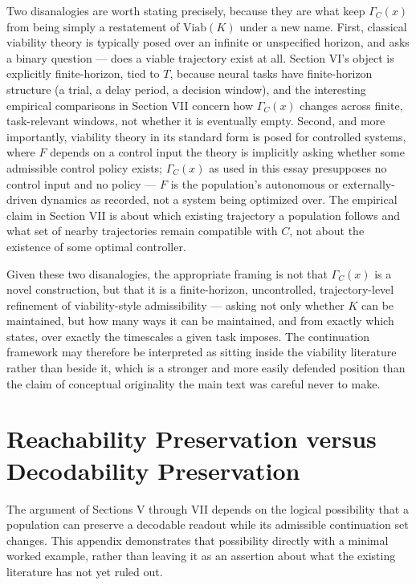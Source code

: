 \documentclass[11pt]{article}
\begin{document}
Two disanalogies are worth stating precisely, because they are what keep $\Gamma_C(x)$ from being simply a restatement of $\mathrm{Viab}(K)$ under a new name. First, classical viability theory is typically posed over an infinite or unspecified horizon, and asks a binary question — does a viable trajectory exist at all. Section VI's object is explicitly finite-horizon, tied to $T$, because neural tasks have finite-horizon structure (a trial, a delay period, a decision window), and the interesting empirical comparisons in Section VII concern how $\Gamma_C(x)$ changes across finite, task-relevant windows, not whether it is eventually empty. Second, and more importantly, viability theory in its standard form is posed for controlled systems, where $F$ depends on a control input the theory is implicitly asking whether some admissible control policy exists; $\Gamma_C(x)$ as used in this essay presupposes no control input and no policy — $F$ is the population's autonomous or externally-driven dynamics as recorded, not a system being optimized over. The empirical claim in Section VII is about which existing trajectory a population follows and what set of nearby trajectories remain compatible with $C$, not about the existence of some optimal controller.

Given these two disanalogies, the appropriate framing is not that $\Gamma_C(x)$ is a novel construction, but that it is a finite-horizon, uncontrolled, trajectory-level refinement of viability-style admissibility — asking not only whether $K$ can be maintained, but how many ways it can be maintained, and from exactly which states, over exactly the timescales a given task imposes. The continuation framework may therefore be interpreted as sitting inside the viability literature rather than beside it, which is a stronger and more easily defended position than the claim of conceptual originality the main text was careful never to make.

\section{Reachability Preservation versus Decodability Preservation}

The argument of Sections V through VII depends on the logical possibility that a population can preserve a decodable readout while its admissible continuation set changes. This appendix demonstrates that possibility directly with a minimal worked example, rather than leaving it as an assertion about what the existing literature has not yet ruled out.
\end{document}
